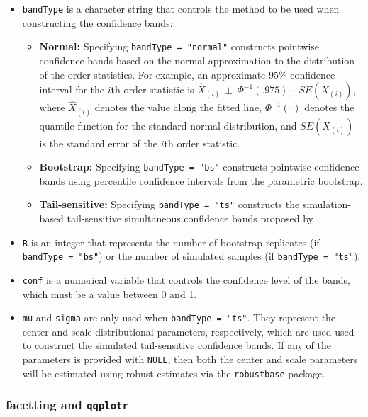 \begin{itemize}
\item
  \texttt{bandType} is a character string that controls the method to be
  used when constructing the confidence bands:

  \begin{itemize}
  \tightlist
  \item
    \textbf{Normal:} Specifying \texttt{bandType\ =\ "normal"}
    constructs pointwise confidence bands based on the normal
    approximation to the distribution of the order statistics. For
    example, an approximate 95\% confidence interval for the \(i\)th
    order statistic is
    \(\widehat{X}_{(i)}~\pm~\Phi^{-1}(.975)~\cdot~SE(X_{(i)})\), where
    \(\widehat{X}_{(i)}\) denotes the value along the fitted line,
    \(\Phi^{-1}(\cdot)\) denotes the quantile function for the standard
    normal distribution, and \(SE(X_{(i)})\) is the standard error of
    the \(i\)th order statistic.
  \item
    \textbf{Bootstrap:} Specifying \texttt{bandType\ =\ "bs"} constructs
    pointwise confidence bands using percentile confidence intervals
    from the parametric bootstrap.
  \item
    \textbf{Tail-sensitive:} Specifying \texttt{bandType\ =\ "ts"}
    constructs the simulation-based tail-sensitive simultaneous
    confidence bands proposed by \citet{Aldor-Noiman2013-xw}.
  \end{itemize}
\item
  \texttt{B} is an integer that represents the number of bootstrap
  replicates (if \texttt{bandType\ =\ "bs"}) or the number of simulated
  samples (if \texttt{bandType\ =\ "ts"}).
\item
  \texttt{conf} is a numerical variable that controls the confidence
  level of the bands, which must be a value between 0 and 1.
\item
  \texttt{mu} and \texttt{sigma} are only used when
  \texttt{bandType\ =\ "ts"}. They represent the center and scale
  distributional parameters, respectively, which are used used to
  construct the simulated tail-sensitive confidence bands. If any of the
  parameters is provided with \texttt{NULL}, then both the center and
  scale parameters will be estimated using robust estimates via the
  \texttt{robustbase} package.
\end{itemize}

\subsubsection{\texorpdfstring{facetting and
\texttt{qqplotr}}{facetting and qqplotr}}\label{facetting-and-qqplotr}

